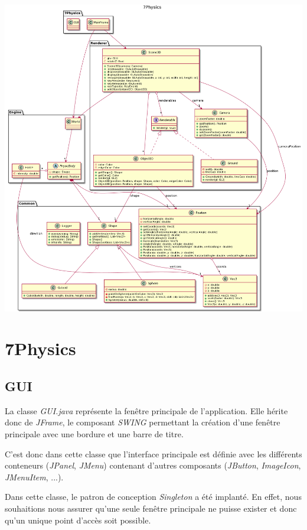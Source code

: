 \documentclass[11pt]{report}
\begin{document}
\begin{center}
  \includegraphics[width=18cm]{./diagramme_classe.png}
\end{center}

\section{7Physics}

\subsection{GUI}
La classe \textit{GUI.java} représente la fenêtre principale de l'application. Elle hérite donc de \textit{JFrame}, le composant \textit{SWING} permettant la création d'une fenêtre principale avec une bordure et une barre de titre.

C'est donc dans cette classe que l'interface principale est définie avec les différents conteneurs (\textit{JPanel}, \textit{JMenu}) contenant d'autres composants (\textit{JButton}, \textit{ImageIcon}, \textit{JMenuItem}, ...).

Dans cette classe, le patron de conception \textit{Singleton} a été implanté. En effet, nous souhaitions nous assurer qu'une seule fenêtre principale ne puisse exister et donc qu'un unique point d'accès soit possible.
\end{document}
